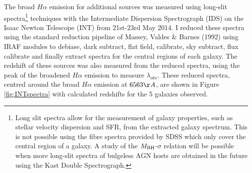 The broad $H\alpha$ emission for  { additional sources} was measured using long-slit spectra\footnote{Long slit spectra allow for the measurement of galaxy properties, such as stellar velocity dispersion and SFR, from the extracted galaxy spectrum. This is not possible using the fibre spectra provided by SDSS which only cover the central region of a galaxy. A study of the $M_{\rm{BH}}$-$\sigma$ relation will be possible when more long-slit spectra of bulgeless AGN hosts are obtained in the future using the Kast Double Spectrograph.} techniques with the Intermediate Dispersion Spectrograph (IDS) on the Isaac Newton Telescope (INT) from 21st-23rd May 2014. I reduced these spectra using the standard reduction pipeline of Massey, Valdes \& Barnes (1992) using IRAF modules to debiase, dark subtract, flat field, calibrate, sky subtract, flux calibrate and finally extract spectra for the central regions of each galaxy. The redshift of these sources was also measured from the reduced spectra, using the peak of the broadened $H\alpha$ emission to measure $\lambda_{obs}$. These reduced spectra, centred around the broad $H\alpha$ emission at $6563\AA$, are shown in Figure \ref{fig:INTspectra} with calculated redshifts for the 5 galaxies observed.


